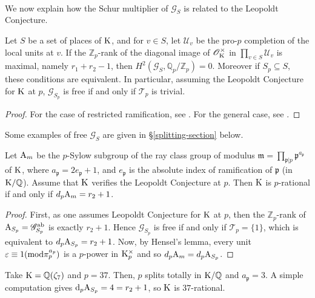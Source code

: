 \documentclass[12pt,a4paper,twoside,english]{smfart}
\def\K{{\rm K}}
\def\Q{{\mathbb Q}}
\def\Z{{\mathbb Z}}
\def\d{{\rm d}}
\def\G{{\mathcal G}}
\def\O{{\mathcal O}}
\def\U{{\mathcal U}}
\def\To{{\mathcal T}}
\def\p{{\mathfrak p}}
\def\mm{{\mathfrak m}}
\def\ab{{\mathrm{ab}}}
\def\A{{\rm A}}
\def\mod{{\rm mod}}
\begin{document}
\

We now explain how the Schur multiplier of $\G_S$ is related to the Leopoldt Conjecture.

\begin{prop}
Let $S$ be a set of places of $\K$, and for $v \in S$, let $\U_v$ be the pro-$p$ completion of the local units  at $v$. If the $\Z_p$-rank of the diagonal image of $\O_\K^\times$ in $\prod_{v\in S}\U_v$ is maximal, namely $r_1+r_2-1$, then $H^2(\G_S,\Q_p/\Z_p)=0$. 
Moreover if $S_p \subseteq S$, these conditions are equivalent. In particular,  assuming the Leopoldt Conjecture for $\K$ at $p$,   $\G_{S_p}$ is free if and only if $\To_p$ is trivial.
\end{prop}

\begin{proof}
For the case of restricted ramification, see  \cite{maire}. For the general case, see \cite[Corollaire 1.5]{Nguyen}. 
\end{proof}

\begin{rema}
Some examples of free $\G_S$ are given in \S \ref{splitting-section} below. 
\end{rema}

\begin{prop}
Let
 $\A_{\mm}$ be the $p$-Sylow subgroup of the ray class  group of modulus $\displaystyle{\mm= \prod_{\p|p} \p^{a_\p}}$ of $\K$, where $a_\p=2 e_\p+1$, and $e_\p$ is the absolute index of ramification of $\p$ (in $\K/\Q$).  Assume that $\K$ verifies the Leopoldt Conjecture at $p$. 
Then $\K$ is $p$-rational if and only if $d_p \A_{\mm}=r_2+1$.
\end{prop}

\begin{proof}
First, as one assumes Leopoldt Conjecture for $\K$ at $p$, then the $\Z_p$-rank of $\A_{S_p}=\G_{S_p}^\ab$ is exactly $r_2+1$. Hence $\G_{S_p}$ is free if and only if $\To_p=\{1\}$, which is equivalent to $d_p \A_{S_p}=r_2+1$. Now, by Hensel's lemma,   every unit $\varepsilon \equiv 1 (\mod \pi_\p^{a_\p})$ is  a $p$-power in $\K_\p^\times$ and so $d_p  \A_{\mm}=d_p \A_{S_p}$.
\end{proof}


\begin{exem} \label{exemple-p=37}
Take $\K=\Q(\zeta_7)$ and $p=37$. Then, $p$ splits totally in $\K/\Q$ and $a_\p=3$. A simple computation gives $\d_p \A_{S_p}=4=r_2+1$, so $\K$ is $37$-rational.
\end{exem}
\end{document}
